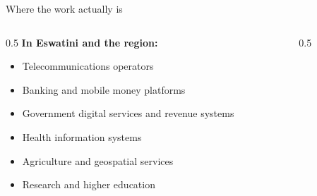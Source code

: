 \documentclass[aspectratio=169]{beamer}
\begin{document}
\begin{frame}{Where the work actually is}
  \begin{columns}[T]
    \begin{column}{0.5\textwidth}
      \textbf{In Eswatini and the region:}
      \begin{itemize}[<+->]
        \item Telecommunications operators
        \item Banking and mobile money platforms
        \item Government digital services and revenue systems
        \item Health information systems
        \item Agriculture and geospatial services
        \item Research and higher education
      \end{itemize}
    \end{column}
    \begin{column}{0.5\textwidth}
    \end{column}
  \end{columns}
\end{frame}
\end{document}
